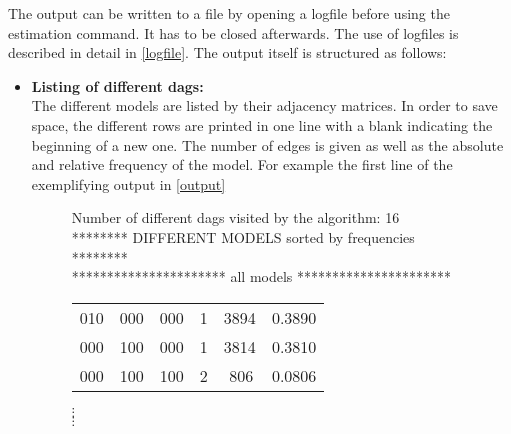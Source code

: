 The output can be written to a file by opening a logfile before
using the estimation command. It has to be closed afterwards. The
use of logfiles is described in detail in \autoref{logfile}. The
output itself is structured as follows:
\begin{itemize}
\item {\bf\sffamily Listing of different dags:}\\
The different models are listed by their adjacency matrices. In
order to save space, the different rows are printed in one line
with a blank indicating the beginning of a new one. The number of
edges is given as well as the absolute and relative frequency of
the model. For example the first line of the exemplifying output
in \autoref{output}
%
\begin{figure}
\begin{center}
{\it

Number of different dags visited by the algorithm: 16 \\[0.5cm]
******** DIFFERENT MODELS sorted by frequencies  ******** \\
********************** all models ********************** \\[0.2cm]

\begin{tabular}{llllll}
010 \hspace{0.2cm}& 000 \hspace{0.2cm}& 000 \hspace{0.5cm}&    1  \hspace{0.5cm}& 3894  \hspace{0.5cm}&  0.3890 \\
000 \hspace{0.2cm}& 100 \hspace{0.2cm}& 000 \hspace{0.5cm}&    1  \hspace{0.5cm}& 3814  \hspace{0.5cm}&  0.3810 \\
000 \hspace{0.2cm}& 100 \hspace{0.2cm}& 100 \hspace{0.5cm}&    2
\hspace{0.5cm}& \,\,806   \hspace{0.5cm}&  0.0806
\end{tabular}
}


$\vdots$ \\[-0.15cm]
$\vdots$


\end{center}
\end{figure}
\end{itemize}

